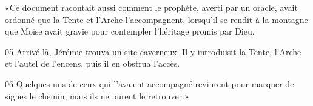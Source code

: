 
«Ce document racontait aussi comment le prophète, averti par un oracle, avait ordonné que la Tente et l’Arche l’accompagnent, lorsqu’il se rendit à la montagne que Moïse avait gravie pour contempler l’héritage promis par Dieu.

05 Arrivé là, Jérémie trouva un site caverneux. Il y introduisit la Tente, l’Arche et l’autel de l’encens, puis il en obstrua l’accès.

06 Quelques-uns de ceux qui l’avaient accompagné revinrent pour marquer de signes le chemin, mais ils ne purent le retrouver.»
